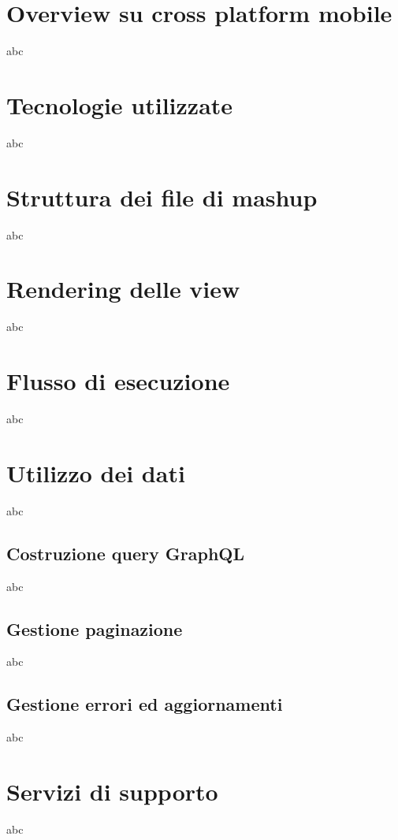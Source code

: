\section{Overview su cross platform mobile}

abc

\section{Tecnologie utilizzate}

abc

\section{Struttura dei file di mashup}

abc

\section{Rendering delle view}

abc

\section{Flusso di esecuzione}

abc

\section{Utilizzo dei dati}

abc

\subsection{Costruzione query GraphQL}

abc

\subsection{Gestione paginazione}

abc

\subsection{Gestione errori ed aggiornamenti}

abc

\section{Servizi di supporto}

abc